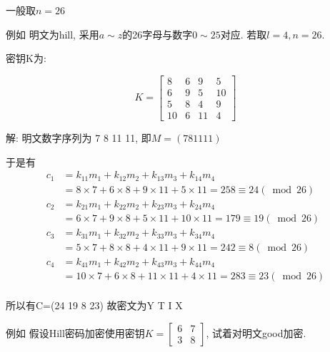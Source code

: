 \documentclass[UTF8]{ctexart}
\begin{document}
\begin{itemize}
\begin{enumerate}
            一般取$n=26$

            例如 明文为hill, 采用$a\sim z$的26字母与数字$0\sim 25$对应. 若取$l=4, n=26$.

            密钥K为:

            $$K=\left[ \begin{array}{cccc}{8} &{6} &{9} &{5}\\ {6} &{9} &{5} &{10}\\ {5} &{8} &{4} &{9}\\ {10} &{6} &{11} &{4}\end{array} \right]$$

            解: 明文数字序列为 7 8 11 11, 即$M=(7 8 11 11)$

            于是有
            \begin{equation}
                \begin{aligned}
                    c_1&=k_{11}m_1+k_{12}m_2+k_{13}m_3+k_{14}m_4\\
                    &=8\times 7+6\times 8+9\times 11+5\times 11=258\equiv 24(\bmod 26)\\
                    c_2&=k_{21}m_1+k_{22}m_2+k_{23}m_3+k_{24}m_4\\
                    &=6\times 7+9\times 8+5\times 11+10\times 11=179\equiv 19(\bmod 26)\\
                    c_3&=k_{31}m_1+k_{32}m_2+k_{33}m_3+k_{34}m_4\\
                    &=5\times 7+8\times 8+4\times 11+9\times 11=242\equiv 8(\bmod 26)\\
                    c_4&=k_{41}m_1+k_{42}m_2+k_{43}m_3+k_{44}m_4\\
                    &=10\times 7+6\times 8+11\times 11+4\times 11=283\equiv 23(\bmod 26)\\
                \end{aligned}
            \end{equation}

            所以有C=(24 19 8 23)
            故密文为Y T I X

            例如 假设Hill密码加密使用密钥$K=\left[ \begin{array}{cc}{6} &{7}\\ {3} &{8} \end{array}\right]$, 试着对明文good加密.


\end{enumerate}
\end{itemize}
\end{document}
